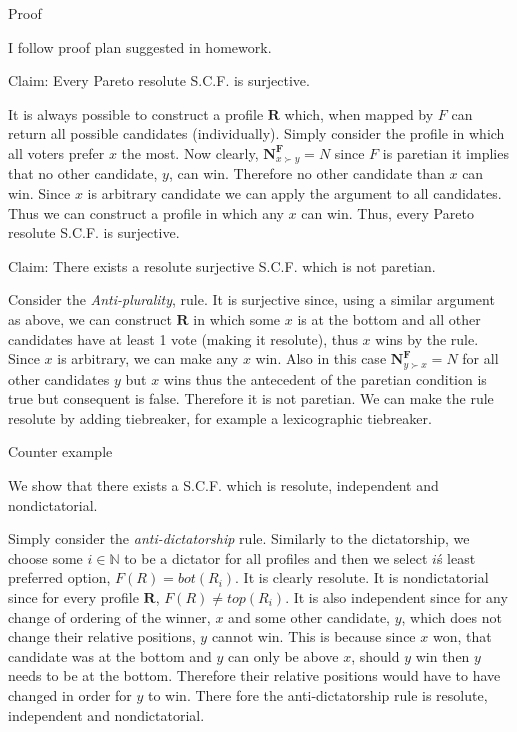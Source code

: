 \documentclass[12pt]{article}
\newcommand{\N}{\mathbb{N}}
\newenvironment{answer}[2][Answer]{\begin{trivlist}
\item[\hskip \labelsep {\bfseries #1}\hskip \labelsep {\bfseries #2:}]}{\end{trivlist}}
\begin{document}
\begin{answer}{a)}{Proof}

I follow proof plan suggested in homework.

Claim: Every Pareto resolute S.C.F. is surjective.

It is always possible to construct a profile $\boldsymbol{R}$ which, when mapped by $F$ can return all possible candidates (individually).
Simply consider the profile in which all voters prefer $x$ the most. Now clearly, $\mathbf{N}^{\mathbf{F}}_{x\succ y}=N$ since $F$ is paretian it implies that no other candidate, $y$, can win. Therefore no other candidate than $x$ can win. Since $x$ is arbitrary candidate we can apply the argument to all candidates. Thus we can construct a profile in which any $x$ can win. Thus, every Pareto resolute S.C.F. is surjective.

Claim: There exists a resolute surjective S.C.F. which is not paretian.

Consider the \textit{Anti-plurality}, rule. It is surjective since, using a similar argument as above, we can construct $\boldsymbol{R}$ in which some $x$ is at the bottom and all other candidates have at least 1 vote (making it resolute), thus $x$ wins by the rule. Since $x$ is arbitrary, we can make any $x$ win. Also in this case $\mathbf{N}^{\mathbf{F}}_{y\succ x}=N$ for all other candidates $y$ but $x$ wins thus the antecedent of the paretian condition is true but consequent is false. Therefore it is not paretian. We can make the rule resolute by adding tiebreaker, for example a lexicographic tiebreaker.
\end{answer}
\begin{answer}{b)}{Counter example}

We show that there exists a S.C.F. which is resolute, independent and nondictatorial.

Simply consider the \textit{anti-dictatorship} rule. Similarly to the dictatorship, we choose some $i \in \N$ to be a dictator for all profiles and then we select $i$\'s least preferred option, $F(R)=bot(R_i)$. It is clearly resolute. It is nondictatorial since for every profile $\boldsymbol{R}$, $F(R) \neq top(R_i)$. It is also independent since for any change of ordering of the winner, $x$ and some other candidate, $y$, which does not change their relative positions, $y$ cannot win. This is because since $x$ won, that candidate was at the bottom and $y$ can only be above $x$, should $y$ win then $y$ needs to be at the bottom. Therefore their relative positions would have to have changed in order for $y$ to win. There fore the anti-dictatorship rule is resolute, independent and nondictatorial.
\end{answer}
\end{document}
